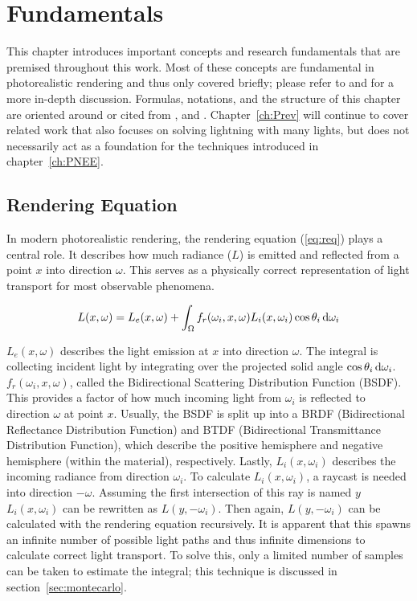 \chapter{Fundamentals}
\label{ch:Fundamentals}
This chapter introduces important concepts and research fundamentals that are premised throughout this work. Most of these concepts are fundamental in photorealistic rendering and thus only covered briefly; please refer to \textcite{veach1997robust} and \textcite{DBLP:conf/siggraph/Kajiya86} for a more in-depth discussion. Formulas, notations, and the structure of this chapter are oriented around or cited from \textcite{lecture}, \textcite{lectureVis} and \textcite{pbrt}. Chapter~\ref{ch:Prev} will continue to cover related work that also focuses on solving lightning with many lights, but does not necessarily act as a foundation for the techniques introduced in chapter~\ref{ch:PNEE}.


\section{Rendering Equation}

In modern photorealistic rendering, the rendering equation (\ref{eq:req}) plays a central role. It describes how much radiance ($L$) is emitted and reflected from a point $x$ into direction $\omega$. This serves as a physically correct representation of light transport for most observable phenomena.

\begin{align}
\label{eq:req}
L(x, \omega) =  L_e(x, \omega) + \int_{\Omega}f_r(\omega_i, x, \omega) L_i(x, \omega_i)\cos\theta_i \mathop{}\!\mathrm{d}\omega_i 
\end{align}

$L_e(x, \omega)$ describes the light emission at $x$ into direction $\omega$. The integral is collecting incident light by integrating over the projected solid angle $\cos\theta_i\mathop{}\!\mathrm{d}\omega_i$. $f_r(\omega_i, x, \omega)$, called the Bidirectional Scattering Distribution Function (BSDF). This provides a factor of how much incoming light from $\omega_i$ is reflected to direction $\omega$ at point $x$. Usually, the BSDF is split up into a BRDF (Bidirectional Reflectance Distribution Function) and BTDF (Bidirectional Transmittance Distribution Function), which describe the positive hemisphere and negative hemisphere (within the material), respectively. Lastly, $L_i(x, \omega_i)$ describes the incoming radiance from direction $\omega_i$. To calculate $L_i(x, \omega_i)$, a raycast is needed into direction $-\omega$. Assuming the first intersection of this ray is named $y$ $L_i(x, \omega_i)$ can be rewritten as $L(y, -\omega_i)$. Then again, $L(y, -\omega_i)$ can be calculated with the rendering equation recursively. It is apparent that this spawns an infinite number of possible light paths and thus infinite dimensions to calculate correct light transport. To solve this, only a limited number of samples can be taken to estimate the integral; this technique is discussed in section~\ref{sec:montecarlo}.

